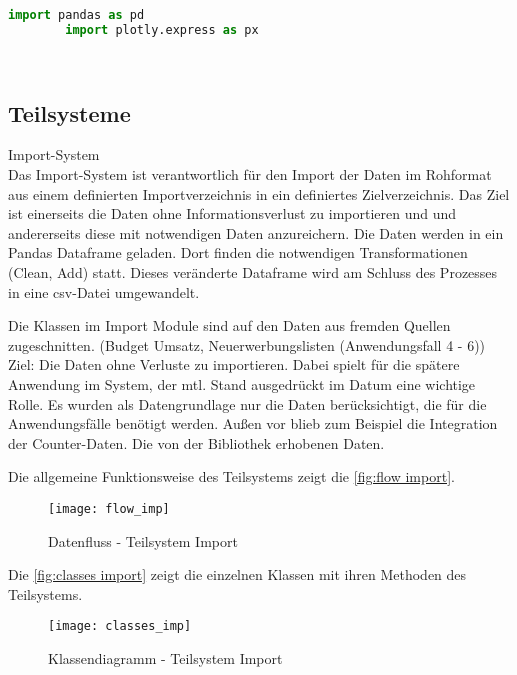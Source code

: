     \begin{lstlisting}[language=Python, caption=Python example]
        import pandas as pd
        import plotly.express as px

        
    \end{lstlisting}

    \subsection{Teilsysteme}
    
    Import-System\\
    Das Import-System ist verantwortlich für den Import der Daten im Rohformat aus einem definierten Importverzeichnis in ein definiertes Zielverzeichnis. Das Ziel
    ist einerseits die Daten ohne Informationsverlust zu importieren und und andererseits diese mit notwendigen Daten anzureichern. Die Daten werden in ein Pandas Dataframe
    geladen. Dort finden die notwendigen Transformationen (Clean, Add) statt. Dieses veränderte Dataframe wird am Schluss des Prozesses in eine csv-Datei umgewandelt.
    
    Die Klassen im Import Module sind auf den Daten aus fremden Quellen zugeschnitten.
    (Budget Umsatz, Neuerwerbungslisten (Anwendungsfall 4 - 6))
    Ziel: Die Daten ohne Verluste zu importieren. Dabei spielt für die spätere Anwendung im System, der mtl. Stand
    ausgedrückt im Datum eine wichtige Rolle.
    Es wurden als Datengrundlage nur die Daten berücksichtigt, die für die Anwendungsfälle benötigt werden.
    Außen vor blieb zum Beispiel die Integration der Counter-Daten.
    Die von der Bibliothek erhobenen Daten.
    
    Die allgemeine Funktionsweise des Teilsystems zeigt die \autoref{fig:flow import}.

    \begin{figure}[H]
        \centering
            \texttt{[image: flow\_imp]}
            \caption{Datenfluss - Teilsystem Import}
            \label{fig:flow import}
    \end{figure}
    
    Die \autoref{fig:classes import} zeigt die einzelnen Klassen mit ihren Methoden des Teilsystems.

    \begin{figure}[H]
        \centering
            \texttt{[image: classes\_imp]}
            \caption{Klassendiagramm - Teilsystem Import}
            \label{fig:classes import}
    \end{figure}
    
